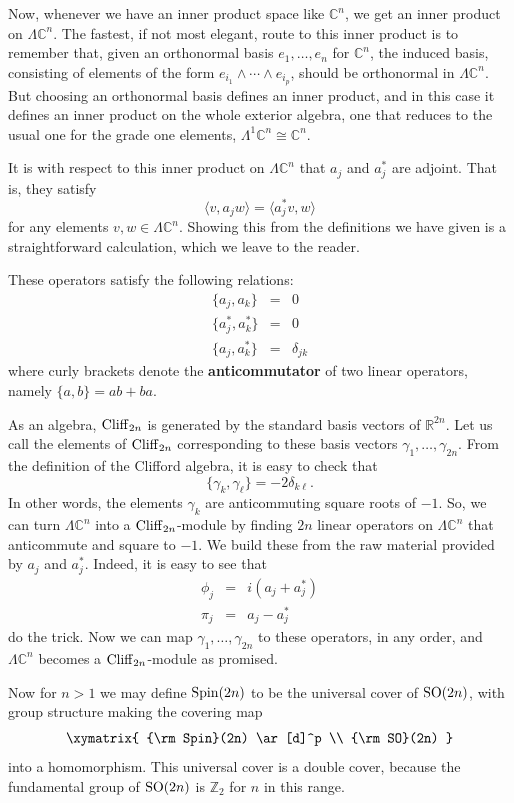 \documentclass[12pt]{article}
\newcommand{\R}{{\mathbb R}}  %
\newcommand{\C}{{\mathbb C}}  %
\newcommand{\Z}{{\mathbb Z}}  %
\newcommand{\SO}{{\rm SO}}    %
\newcommand{\Spin}{{\rm Spin}}    %
\newcommand{\Ex}{\Lambda} %
\newcommand{\Cliff}{{\rm Cliff}}    %
\newcommand{\iso}{\cong} %
\begin{document}
Now, whenever we have an inner product space like $\C^n$, we get an inner
product on $\Ex \C^n$. The fastest, if not most elegant, route to this inner
product is to remember that, given an orthonormal basis $e_1, \ldots, e_n$ for
$\C^n$, the induced basis, consisting of elements of the form $e_{i_1} \wedge
\cdots \wedge e_{i_p}$, should be orthonormal in $\Ex \C^n$. But choosing an
orthonormal basis defines an inner product, and in this case it defines an
inner product on the whole exterior algebra, one that reduces to the usual one
for the grade one elements, $\Ex^1 \C^n \iso \C^n$.

It is with respect to this inner product on $\Ex \C^n$ that $a_j$ and $a_j^*$
are adjoint. That is, they satisfy
\[ \langle v, a_jw \rangle = \langle a_j^*v, w \rangle \]
for any elements $v,w \in \Ex \C^n$. Showing this from the definitions we have
given is a straightforward calculation, which we leave to the reader.

These operators satisfy the following relations:
\begin{eqnarray*} 
	\{ a_j, a_k \} & = & 0 \\
	\{ a_j^*, a_k^* \} & = & 0 \\
	\{ a_j, a_k^* \} & = & \delta_{jk}
\end{eqnarray*}
where curly brackets denote the \textbf{anticommutator} of two linear
operators, namely $\{a, b\} = ab + ba$.

As an algebra, $\Cliff_{2n}$ is generated by the standard basis vectors of
$\R^{2n}$.  Let us call the elements of $\Cliff_{2n}$ corresponding to these
basis vectors $\gamma_1, \ldots, \gamma_{2n}$.  From the definition of
the Clifford algebra, it is easy to check that
\[      \{   \gamma_k , \gamma_\ell \} = -2\delta_{k\ell}  .\]  
In other words, the elements
$\gamma_k$ are anticommuting square roots of $-1$.  So, we can turn 
$\Ex \C^n$ into a $\Cliff_{2n}$-module by finding $2n$ linear operators 
on $\Ex \C^n$ that anticommute and square to $-1$.  We build these from 
the raw material provided by $a_j$ and $a_j^*$.  Indeed, it is easy to
see that 
\begin{eqnarray*}
	\phi_j & = & i(a_j + a_j^*) \\
	\pi_j  & = & a_j - a_j^*
\end{eqnarray*}
do the trick.  Now we can map $\gamma_1, \ldots, \gamma_{2n}$ to these 
operators, in any order, and $\Ex \C^n$ becomes a $\Cliff_{2n}$-module as 
promised.  

Now for $n > 1$ we may define $\Spin(2n)$ to be the universal cover of 
$\SO(2n)$, with group structure making the covering map
\[
\xymatrix{
	\Spin(2n) \ar[d]^p \\
	\SO(2n)
}
\]
into a homomorphism.  This universal cover is a double cover, because
the fundamental group of $\SO(2n)$ is $\Z_2$ for $n$ in this range.
\end{document}
